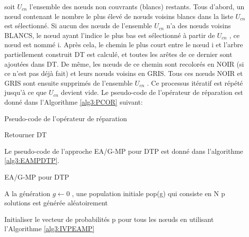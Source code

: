 \begin{enumerate}[label=\alph*)]
soit $U_{cn}$ l’ensemble des nœuds non couvrants (blancs) restants. Tous d’abord, un nœud contenant le nombre  le plus élevé de nœuds voisins blancs dans la liste $U_{cn}$ est sélectionné. Si aucun des nœuds de l’ensemble $U_{cn}$ n’a des nœuds voisins BLANCS, le nœud ayant l’indice le plus bas est sélectionné à partir de $U_{cn}$ , ce nœud est nommé i. Après cela, le chemin le plus court entre le nœud i et l’arbre partiellement construit DT est calculé, et toutes les arêtes de ce dernier sont ajoutées dans DT. De même, les nœuds de ce chemin sont recolorés en NOIR (si ce n’est pas déjà fait) et leurs nœuds voisins en GRIS. Tous ces nœuds NOIR et GRIS sont ensuite supprimés de l’ensemble $U_{cn}$ . Ce processus itératif  est répété jusqu’à ce que $U_{cn}$ devient vide. Le pseudo-code de l’opérateur de réparation est donné dans l’Algorithme \ref{alg3:PCOR} suivant:

\begin{algorithm}[H]
\label{alg3:PCOR}
\caption{Pseudo-code de l’opérateur de réparation}
\SetAlgoLined
\DontPrintSemicolon


Retourner DT \;

\end{algorithm}


Le pseudo-code de l’approche EA/G-MP pour DTP est donné dans l'algorithme \ref{alg3:EAMPDTP}.

\begin{algorithm}[H]
\label{alg3:EAMPDTP}
\caption{EA/G-MP pour DTP}
\SetAlgoLined
\DontPrintSemicolon

A la génération $g \gets 0 $ , une population initiale pop(g) qui consiste en N p solutions est générée aléatoirement \;

Initialiser le vecteur de probabilités p pour tous les nœuds en utilisant l’Algorithme \ref{alg3:IVPEAMP} \;

\end{algorithm}
\end{enumerate}
